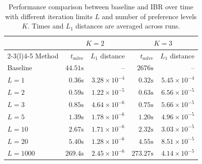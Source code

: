 \begin{table}
\centering
\caption{Performance comparison between baseline
         and IBR over time with different iteration limits $L$
         and number of preference levels $K$.
         Times and $L_1$ distances are averaged across runs.
         }
\label{tab:results}
\begin{tabular}{@{}lrrrr@{}}
& \multicolumn{2}{c}{$K=2$} & \multicolumn{2}{c}{$K=3$} \\
\cmidrule(r){2-3}\cmidrule(l){4-5}
Method   & $t_\text{solve}$     & $L_1$ distance & $t_\text{solve}$     & $L_1$ distance \\ \midrule
Baseline & $44.51 \si{\second}$ & --               & $2676 \si{\second}$  & --               \\ %
$L=1$    & $0.36 \si{\second}$  & $3.28\times 10^{-4}$         & $0.32 \si{\second}$  & $5.45\times 10^{-4}$         \\
$L=2$    & $0.59 \si{\second}$  & $1.22 \times 10^{-5}$         & $0.63 \si{\second}$  & $6.56\times 10^{-5}$         \\
$L=3$    & $0.85 \si{\second}$  & $4.64\times 10^{-6}$         & $0.75 \si{\second}$   & $5.66\times 10^{-5}$         \\
$L=5$    & $1.39 \si{\second}$  & $1.78\times 10^{-6}$         & $1.20 \si{\second}$  & $4.96\times 10^{-5}$         \\
$L=10$   & $2.67 \si{\second}$  & $1.71\times 10^{-6}$         & $2.32 \si{\second}$  & $3.03\times 10^{-5}$         \\
$L=20$   & $5.40 \si{\second}$  & $1.28\times 10^{-6}$        & $4.55 \si{\second}$  & $8.51\times 10^{-5}$         \\
$L=1000$ & $269.4 \si{\second}$ & $2.45\times 10^{-6}$          & $273.27 \si{\second}$ & $4.14\times 10^{-5}$         \\
\bottomrule
\end{tabular}
\end{table}

